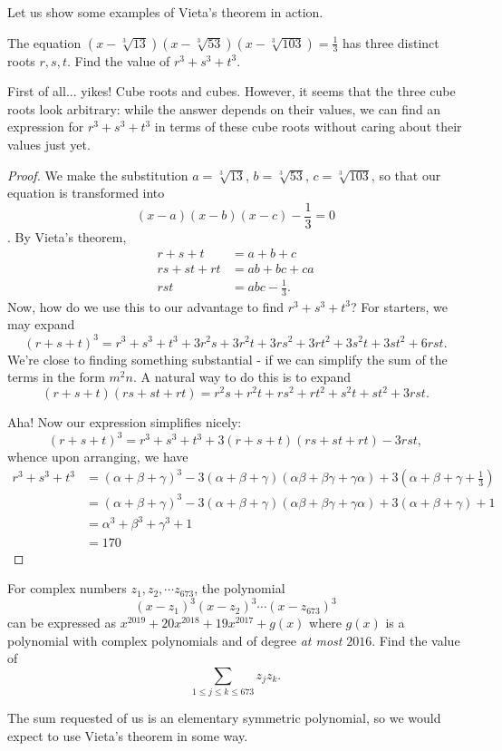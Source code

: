 \documentclass[../jarvis.tex]{subfiles}
\begin{document}
Let us show some examples of Vieta's theorem in action. 
\begin{example}
    The equation $(x-\sqrt[3]{13})(x-\sqrt[3]{53})(x-\sqrt[3]{103})=\frac{1}{3}$ has three distinct roots $r,s,t$. Find the value of $r^3+s^3+t^3$.
\end{example}

First of all... yikes! Cube roots and cubes. However, it seems that the three cube roots look arbitrary: while the answer depends on their values, we can find an expression for $r^3+s^3+t^3$ in terms of these cube roots without caring about their values just yet. 
\begin{proof}
    We make the substitution $a=\sqrt[3]{13}$, $b=\sqrt[3]{53}$, $c=\sqrt[3]{103}$, so that our equation is transformed into $$(x-a)(x-b)(x-c)-\frac{1}{3}=0$$. By Vieta's theorem, 
\begin{align*}
    r+s+t&=a+b+c \\
    rs+st+rt&=ab+bc+ca \\
    rst&=abc-\frac{1}{3}.
\end{align*}
Now, how do we use this to our advantage to find $r^3+s^3+t^3$? For starters, we may expand
$$(r+s+t)^3=r^3+s^3+t^3+3r^2s+3r^2t+3rs^2+3rt^2+3s^2t+3st^2+6rst.$$
We're close to finding something substantial - if we can simplify the sum of the terms in the form $m^2n$. A natural way to do this is to expand
$$(r+s+t)(rs+st+rt)=r^2s+r^2t+rs^2+rt^2+s^2t+st^2+3rst.$$

Aha! Now our expression simplifies nicely:
$$(r+s+t)^3=r^3+s^3+t^3+3(r+s+t)(rs+st+rt)-3rst,$$
whence upon arranging, we have
\begin{align*}
    r^3+s^3+t^3
    &=(\alpha+\beta+\gamma)^3-3(\alpha+\beta+\gamma)(\alpha\beta+\beta\gamma+\gamma\alpha)+3(\alpha+\beta+\gamma+\frac{1}{3})\\
    &=(\alpha+\beta+\gamma)^3-3(\alpha+\beta+\gamma)(\alpha\beta+\beta\gamma+\gamma\alpha)+3(\alpha+\beta+\gamma)+1 \\
    &=\alpha^3+\beta^3+\gamma^3+1 \\
    &=\boxed{170}
\end{align*}
\end{proof}

\begin{example}[2019 AIME I P10]
For complex numbers $z_1, z_2,\cdots z_{673}$, the polynomial
$$(x-z_1)^3(x-z_2)^3\cdots(x-z_673)^3$$
can be expressed as $x^{2019}+20x^{2018}+19x^{2017}+g(x)$ where $g(x)$ is a polynomial with complex polynomials and of degree \textit{at most} $2016$. Find the value of 
$$\sum_{1\leq j\leq k\leq 673}z_jz_k.$$
\end{example}
The sum requested of us is an elementary symmetric polynomial, so we would expect to use Vieta's theorem in some way.
\end{document}
